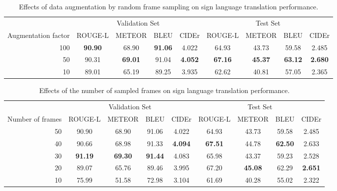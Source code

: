 \documentclass[10pt,twocolumn,letterpaper]{article}
\begin{document}
\begin{table*}
\centering
\begin{tabular}{@{ }rcccccccc@{ }}
\toprule
& \multicolumn{4}{c}{Validation Set} & \multicolumn{4}{c}{Test Set} \\
\cmidrule(lr){2-5} \cmidrule(lr){6-9}
Augmentation factor    &   ROUGE-L & METEOR  & BLEU  & CIDEr &  ROUGE-L & METEOR  & BLEU & CIDEr\\
\midrule
100 & \textbf{90.90} & 68.90 & \textbf{91.06} & 4.022 & 64.93 & 43.73 & 59.58 & 2.485\\
50 & 90.31 & \textbf{69.01} & 91.04 & \textbf{4.052} & \textbf{67.16} & \textbf{45.37} & \textbf{63.12} & \textbf{2.680}\\
10 & 89.01 & 65.19 & 89.25 & 3.935 & 62.62 & 40.81 & 57.05 & 2.365\\
\bottomrule
\end{tabular}
\caption{Effects of data augmentation by random frame sampling on sign language translation performance.}
\label{tab:augmentation}
\end{table*}



\begin{table*}
\centering
\begin{tabular}{@{ }rcccccccc@{ }}
\toprule
& \multicolumn{4}{c}{Validation Set} & \multicolumn{4}{c}{Test Set} \\
\cmidrule(lr){2-5} \cmidrule(lr){6-9}
Number of frames    &   ROUGE-L & METEOR  & BLEU  & CIDEr &  ROUGE-L & METEOR  & BLEU & CIDEr\\
\midrule
50 & 90.90 & 68.90 & 91.06 & 4.022 & 64.93 & 43.73 & 59.58 & 2.485\\
40 & 90.66 & 68.98 & 91.33 & \textbf{4.094} & \textbf{67.51} & 44.78 & \textbf{62.50} & 2.633\\
30 & \textbf{91.19} & \textbf{69.30} & \textbf{91.44} & 4.083 & 65.98 & 43.37 & 59.23 & 2.528\\
20 & 89.07 & 65.76 & 89.46 & 3.995 & 67.20 & \textbf{45.08} & 62.29 & \textbf{2.651}\\
10 & 75.99 & 51.58 & 72.98 & 3.104 & 61.69 & 40.28 & 55.02 & 2.322\\
\bottomrule
\end{tabular}
\caption{Effects of the number of sampled frames on sign language translation performance.}
\label{tab:numframes}
\end{table*}
\end{document}
